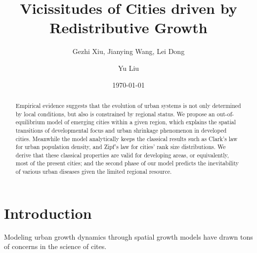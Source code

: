 \documentclass[reprint,unsortedaddress,amsmath,amssymb,aps,prl,showkeys]{revtex4-2}
\begin{document}
\title{Vicissitudes of Cities driven by Redistributive Growth}
\author{Gezhi Xiu, Jianying Wang, Lei Dong}
\author{Yu Liu}
\date{\today}

\begin{abstract}
    Empirical evidence suggests that the evolution of urban systems is not only determined by local conditions, but also is constrained by regional status. We propose an out-of-equilibrium model of emerging cities within a given region, which explains the spatial transitions of developmental focus and urban shrinkage phenomenon in developed cities. Meanwhile the model analytically keeps the classical results such as Clark's law for urban population density, and Zipf's law for cities' rank size distributions. We derive that these classical properties are valid for developing areas, or equivalently, most of the present cities; and the second phase of our model predicts the inevitability of various urban diseases given the limited regional resource. 
\end{abstract}

\section{Introduction}

Modeling urban growth dynamics through spatial growth models have drawn tons of concerns in the science of cites. 
\end{document}
